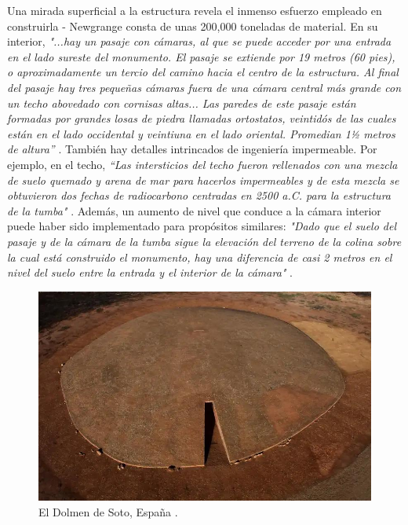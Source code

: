 \documentclass[10pt,twocolumn,letterpaper]{article}
\begin{document}
Una mirada superficial a la estructura revela el inmenso esfuerzo empleado en construirla - Newgrange consta de unas 200,000 toneladas de material. En su interior, \textit{"...hay un pasaje con cámaras, al que se puede acceder por una entrada en el lado sureste del monumento. El pasaje se extiende por 19 metros (60 pies), o aproximadamente un tercio del camino hacia el centro de la estructura. Al final del pasaje hay tres pequeñas cámaras fuera de una cámara central más grande con un techo abovedado con cornisas altas... Las paredes de este pasaje están formadas por grandes losas de piedra llamadas ortostatos, veintidós de las cuales están en el lado occidental y veintiuna en el lado oriental. Promedian 1½ metros de altura”} \cite{70}. También hay detalles intrincados de ingeniería impermeable. Por ejemplo, en el techo, \textit{“Las intersticios del techo fueron rellenados con una mezcla de suelo quemado y arena de mar para hacerlos impermeables y de esta mezcla se obtuvieron dos fechas de radiocarbono centradas en 2500 a.C. para la estructura de la tumba"} \cite{71}. Además, un aumento de nivel que conduce a la cámara interior puede haber sido implementado para propósitos similares: \textit{"Dado que el suelo del pasaje y de la cámara de la tumba sigue la elevación del terreno de la colina sobre la cual está construido el monumento, hay una diferencia de casi 2 metros en el nivel del suelo entre la entrada y el interior de la cámara"} \cite{71}.

\begin{figure}[t]
\begin{center}
   \includegraphics[width=1\linewidth]{dolmen.jpg}
\end{center}
   \caption{El Dolmen de Soto, España \cite{53}.}
\label{fig:9}
\label{fig:onecol}
\end{figure}
\end{document}
